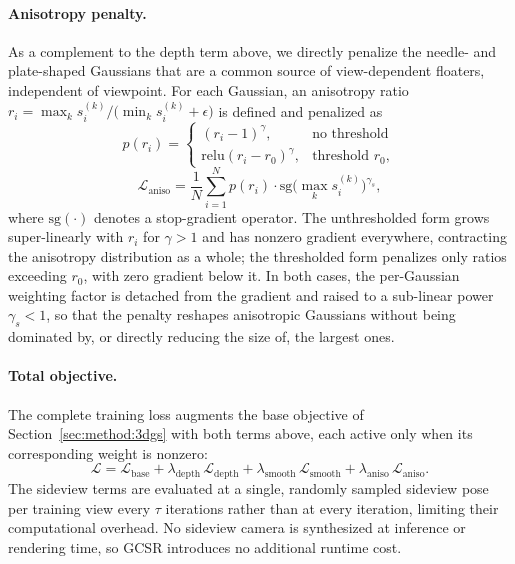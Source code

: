 \paragraph{Anisotropy penalty.}
As a complement to the depth term above, we directly penalize the
needle- and plate-shaped Gaussians that are a common source of
view-dependent floaters, independent of viewpoint. For each Gaussian, an
anisotropy ratio $r_i = \max_k s_i^{(k)} / \big(\min_k s_i^{(k)} +
\epsilon\big)$ is defined and penalized as
\begin{equation}
p(r_i) = \begin{cases} (r_i - 1)^{\gamma}, & \text{no threshold} \\[2pt] \mathrm{relu}(r_i - r_0)^{\gamma}, & \text{threshold } r_0, \end{cases}
\end{equation}
\begin{equation}
\mathcal{L}_{\mathrm{aniso}} = \frac{1}{N}\sum_{i=1}^{N} p(r_i)\cdot \mathrm{sg}\!\big(\max_k s_i^{(k)}\big)^{\gamma_s},
\label{eq:gcsr-aniso}
\end{equation}
where $\mathrm{sg}(\cdot)$ denotes a stop-gradient operator. The
unthresholded form grows super-linearly with $r_i$ for $\gamma > 1$ and has
nonzero gradient everywhere, contracting the anisotropy distribution as a
whole; the thresholded form penalizes only ratios exceeding $r_0$, with
zero gradient below it. In both cases, the per-Gaussian weighting factor is
detached from the gradient and raised to a sub-linear power $\gamma_s < 1$,
so that the penalty reshapes anisotropic Gaussians without being dominated
by, or directly reducing the size of, the largest ones.

\paragraph{Total objective.}
The complete training loss augments the base objective of
Section~\ref{sec:method:3dgs} with both terms above, each active only when
its corresponding weight is nonzero:
\begin{equation}
\mathcal{L} = \mathcal{L}_{\mathrm{base}} + \lambda_{\mathrm{depth}}\,\mathcal{L}_{\mathrm{depth}} + \lambda_{\mathrm{smooth}}\,\mathcal{L}_{\mathrm{smooth}} + \lambda_{\mathrm{aniso}}\,\mathcal{L}_{\mathrm{aniso}}.
\end{equation}
The sideview terms are evaluated at a single, randomly sampled sideview
pose per training view every $\tau$ iterations rather than at every
iteration, limiting their computational overhead. No sideview camera is
synthesized at inference or rendering time, so GCSR introduces no
additional runtime cost.

